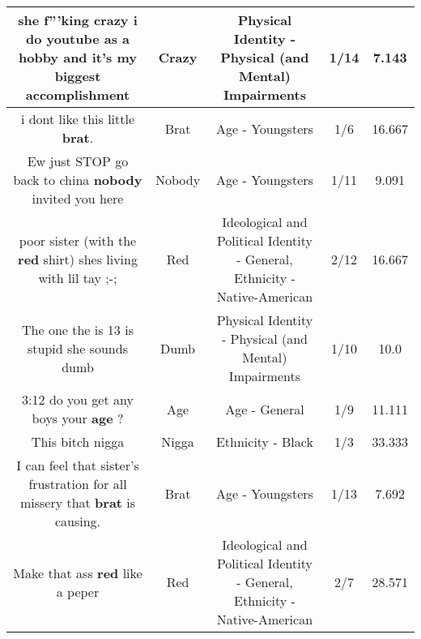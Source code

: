 \documentclass[11pt]{article}
\newlength\mylength
\begin{document}
\begin{center}
\begin{longtable}{|C{.65\mylength}|C{.30\mylength}|C{.12\mylength}|C{.12\mylength}|C{.12\mylength}|}
  \small she f'''king \textbf{crazy} i do youtube as a hobby and it's my biggest accomplishment\normalsize   & Crazy & Physical Identity - Physical (and Mental) Impairments & 1/14 & 7.143 \\  \hline
  \small i dont like this little \textbf{brat}.\normalsize   & Brat & Age - Youngsters & 1/6 & 16.667 \\  \hline
  \small Ew just STOP go back to china \textbf{nobody} invited you here\normalsize   & Nobody & Age - Youngsters & 1/11 & 9.091 \\  \hline
  \small poor sister (with the \textbf{r\textbf{ed}} shirt) shes living with lil tay ;-;\normalsize   & Red &  Ideological and Political Identity - General, Ethnicity - Native-American & 2/12 & 16.667 \\  \hline
  \small The one the is 13 is stupid she sounds dumb\normalsize   & Dumb & Physical Identity - Physical (and Mental) Impairments & 1/10 & 10.0 \\  \hline
  \small 3:12 do you get any boys your \textbf{age} ?\normalsize   & Age & Age - General & 1/9 & 11.111 \\  \hline
  \small This bitch nigga\normalsize   & Nigga & Ethnicity - Black & 1/3 & 33.333 \\  \hline
  \small I can feel that sister's frustration for all missery that \textbf{brat} is causing.\normalsize   & Brat & Age - Youngsters & 1/13 & 7.692 \\  \hline
  \small Make that ass \textbf{r\textbf{ed}} like a peper\normalsize   & Red &  Ideological and Political Identity - General, Ethnicity - Native-American & 2/7 & 28.571 \\  \hline

\end{longtable}
\end{center}
\end{document}
